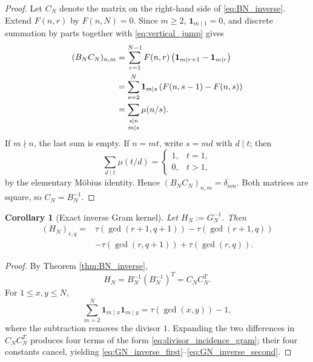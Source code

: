 \documentclass[11pt]{amsart}
\numberwithin{equation}{section}
\theoremstyle{plain}
\newtheorem{corollary}[theorem]{Corollary}
\theoremstyle{definition}
\theoremstyle{remark}
\newcommand{\mob}{\mu}
\begin{document}
\begin{proof}
Let $C_N$ denote the matrix on the right-hand side of \eqref{eq:BN_inverse}.  Extend $F(n,r)$ by $F(n,N)=0$.  Since $m\ge2$, $\mathbf 1_{m\mid1}=0$, and discrete summation by parts together with \eqref{eq:vertical_jump} gives
\begin{align}
(B_NC_N)_{n,m}
&=\sum_{r=1}^{N-1}F(n,r)
\left(\mathbf 1_{m\mid r+1}-\mathbf 1_{m\mid r}\right)\notag\\
&=\sum_{s=2}^{N}\mathbf 1_{m\mid s}
\left(F(n,s-1)-F(n,s)\right)\notag\\
&=\sum_{\substack{s\mid n\\m\mid s}}\mob(n/s).
\label{eq:BC_divisor_sum}
\end{align}
If $m\nmid n$, the last sum is empty.  If $n=mt$, write $s=md$ with $d\mid t$; then
\begin{equation}
\sum_{d\mid t}\mob(t/d)
=
\begin{cases}
1,&t=1,\\
0,&t>1,
\end{cases}
\end{equation}
by the elementary M\"obius identity.  Hence $(B_NC_N)_{n,m}=\delta_{nm}$.  Both matrices are square, so $C_N=B_N^{-1}$.
\end{proof}

\begin{corollary}[Exact inverse Gram kernel]
\label{cor:GN_inverse_kernel}
Let $H_N:=G_N^{-1}$.  Then
\begin{align}
(H_N)_{r,q}
={}&\tau(\gcd(r+1,q+1))-\tau(\gcd(r+1,q))
\label{eq:GN_inverse_first}\\
&-\tau(\gcd(r,q+1))+\tau(\gcd(r,q)).
\label{eq:GN_inverse_second}
\end{align}
\end{corollary}

\begin{proof}
By Theorem \ref{thm:BN_inverse},
\begin{equation}
H_N=B_N^{-1}(B_N^{-1})^T=C_NC_N^T.
\end{equation}
For $1\le x,y\le N$,
\begin{equation}
\sum_{m=2}^{N}\mathbf 1_{m\mid x}\mathbf 1_{m\mid y}
=\tau(\gcd(x,y))-1,
\label{eq:divisor_incidence_gram}
\end{equation}
where the subtraction removes the divisor $1$.  Expanding the two differences in $C_NC_N^T$ produces four terms of the form \eqref{eq:divisor_incidence_gram}; their four constants cancel, yielding \eqref{eq:GN_inverse_first}--\eqref{eq:GN_inverse_second}.
\end{proof}
\end{document}
